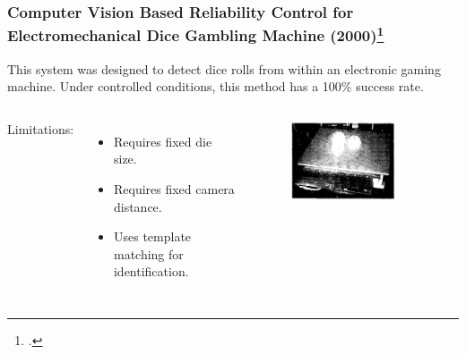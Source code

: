 \documentclass{beamer}
\begin{document}
\begin{frame}
\frametitle{Computer Vision Based Reliability Control for Electromechanical Dice Gambling Machine (2000)\footcite{Lapanjaa}}
	
This system was designed to detect dice rolls from within an electronic gaming machine.
Under controlled conditions, this method has a 100\% success rate.
	
\vspace{\baselineskip}

\begin{columns}


Limitations:
\begin{itemize}
	\item Requires fixed die size.
	\item Requires fixed camera distance.
	\item Uses template matching for identification.
\end{itemize}


\begin{figure}
	\centering
	\includegraphics[width=0.8\textwidth]{prior_2a}
\end{figure}

\end{columns}

\end{frame}
\end{document}
